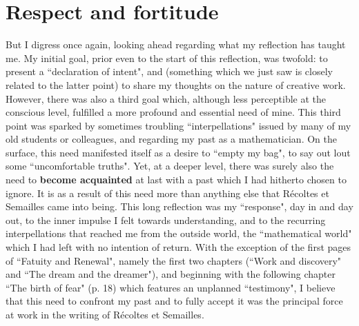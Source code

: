 \section{Respect and fortitude}

But I digress once again, looking ahead regarding what my reflection has taught me.  My initial goal, prior even to the start of this reflection, was twofold: to present a ``declaration of intent", and (something which we just saw is closely related to the latter point) to share my thoughts on the nature of creative work. However, there was also a third goal which, although less perceptible at the conscious level, fulfilled a more profound and essential need of mine. This third point was sparked by sometimes troubling ``interpellations" issued by many of my old students or colleagues, and regarding my past as a mathematician. On the surface, this need manifested itself as a desire to ``empty my bag", to say out lout some ``uncomfortable truths". Yet, at a deeper level, there was surely also the need to \textbf{become acquainted} at last with a past which I had hitherto chosen to ignore. It is as a result of this need more than anything else that R\'ecoltes et Semailles came into being. This long reflection was my ``response", day in and day out, to the inner impulse I felt towards understanding, and to the recurring interpellations that reached me from the outside world, the ``mathematical world" which I had left with no intention of return. With the exception of the first pages of ``Fatuity and Renewal", namely the first two chapters (``Work and discovery" and ``The dream and the dreamer"), and beginning with the following chapter ``The birth of fear" (p. 18) which features an unplanned ``testimony", I believe that this need to confront my past and to fully accept it was the principal force at work in the writing of R\'ecoltes et Semailles.

